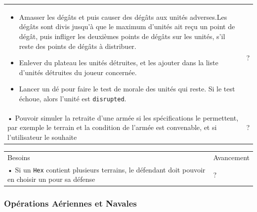\begin{center}
\begin{tabular}[h]{|m{14cm}|m{2cm}|}
\begin{itemize}
            \item Amasser les dégâts et puis causer des dégâts aux unités adverses.\newline Les dégâts sont divis jusqu'à que le maximum d'unités ait reçu un point de dégât, puis infliger les deuxièmes points de dégâts sur les unités, s'il reste des points de dégâts à distribuer.
            \item Enlever du plateau les unités détruites, et les ajouter dans la liste d'unités détruites du joueur concernée.
            \item Lancer un dé pour faire le test de morale des unités qui reste. Si le test échoue, alors l'unité est {\tt disrupted}.
        \end{itemize}                                                                                                                                                       & ?          \\
        • Pouvoir simuler la retraite d'une armée si les spécifications le permettent, par exemple le terrain et la condition de l'armée est convenable, et si l'utilisateur le souhaite & ?          \\
        \hline
    \end{tabular}
\end{center}

\begin{center}
    \centering
    \begin{tabular}[h]{|m{14cm}|m{2cm}|}
        \hline
        \rowcolor[HTML]{C0D8C0}
        \multicolumn{2}{|c|}{\textbf{Priorité 1/3}}                                                                         \\
        \hline
        Besoins                                                                                                & Avancement \\
        \hline
        • Si un {\tt Hex} contient plusieurs terrains, le défendant doit pouvoir en choisir un pour sa défense & ?          \\
        \hline
    \end{tabular}
\end{center}

\subsubsection{Opérations Aériennes et Navales}

